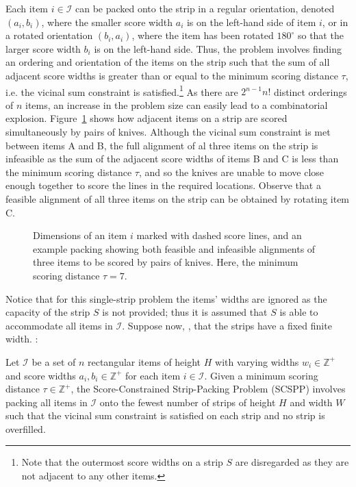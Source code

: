 \documentclass{elsarticle}
\begin{document}
Each item $i \in \mathcal{I}$ can be packed onto the strip in a regular orientation, denoted $(a_i, b_i)$, where the smaller score width $a_i$ is on the left-hand side of item $i$, or in a rotated orientation $(b_i, a_i)$, where the item has been rotated $180^{\circ}$ so that the larger score width $b_i$ is on the left-hand side. Thus, the problem involves finding an ordering and orientation of the items on the strip such that the sum of all adjacent score widths is greater than or equal to the minimum scoring distance $\tau$, i.e. the vicinal sum constraint is satisfied.\footnote{Note that the outermost score widths on a strip $S$ are disregarded as they are not adjacent to any other items.} As there are $2^{n-1} n!$ distinct orderings of $n$ items, an increase in the problem size can easily lead to a combinatorial explosion. Figure~\ref{fig:itemsknife} shows how adjacent items on a strip are scored simultaneously by pairs of knives. Although the vicinal sum constraint is met between items A and B, the full alignment of al three items on the strip is infeasible as the sum of the adjacent score widths of items B and C is less than the minimum scoring distance $\tau$, and so the knives are unable to move close enough together to score the lines in the required locations. Observe that a feasible alignment of all three items on the strip can be obtained by rotating item C.

\begin{figure}[H]	
	\centering
	
	\caption{Dimensions of an item $i$ marked with dashed score lines, and an example packing showing both feasible and infeasible alignments of three items to be scored by pairs of knives. Here, the minimum scoring distance $\tau = 7$.}	
	\label{fig:itemsknife}
\end{figure}

\noindent Notice that for this single-strip problem the items' widths are ignored as the capacity of the strip $S$ is not provided; thus it is assumed that $S$ is able to accommodate all items in $\mathcal{I}$. Suppose now, , that the strips have a fixed finite width. :

\begin{definition} %
	\label{defn:scspp}
	Let $\mathcal{I}$ be a set of $n$ rectangular items of height $H$ with varying widths $w_i \in \mathbb{Z}^+$ and score widths $a_i, b_i \in \mathbb{Z}^+$ for each item $i \in \mathcal{I}$. Given a minimum scoring distance $\tau \in \mathbb{Z}^+$, the Score-Constrained Strip-Packing Problem (SCSPP) involves packing all items in $\mathcal{I}$ onto the fewest number of strips of height $H$ and width $W$ such that the vicinal sum constraint is satisfied on each strip and no strip is overfilled.
\end{definition}
\end{document}
